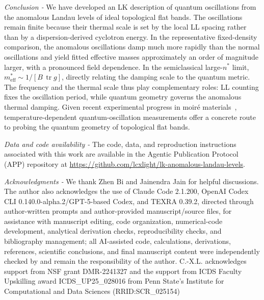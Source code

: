 \documentclass[prl,twocolumn,superscriptaddress,float,aps]{revtex4-2}
\newcommand{\tr}{\operatorname{tr}}
\newcommand{\meff}{m^{*}_{\mathrm{eff}}}
\newcommand{\metric}{g}
\begin{document}

{\it Conclusion - } We have developed an LK description of quantum
oscillations from the anomalous Landau levels of ideal topological flat bands.
The oscillations remain finite because their thermal scale is set by the local
LL spacing rather than by a dispersion-derived cyclotron energy. In the
representative fixed-density comparison, the anomalous oscillations damp much
more rapidly than the normal oscillations and yield fitted effective masses
approximately an order of magnitude larger, with a pronounced field
dependence. In the semiclassical large-$n^*$ limit,
$\meff\sim1/[B\,\tr\metric]$, directly relating the damping scale to the
quantum metric. The frequency and the thermal scale thus play complementary
roles: LL counting fixes the oscillation period, while quantum geometry governs
the anomalous thermal damping. Given recent experimental progress in moir\'e
materials~\cite{cao2018unconventional,serlin2020intrinsic,cai2023signatures,zeng2023thermodynamic,xu2023observation,liu2022quantum},
temperature-dependent quantum-oscillation measurements offer a concrete route
to probing the quantum geometry of topological flat bands.

{\it Data and code availability - }
The code, data, and reproduction instructions associated with this work are
available in the Agentic Publication Protocol (APP) repository at
\url{https://github.com/lcxlight/lk-anomalous-landau-levels}.

{\it Acknowledgments - }
We thank Zhen Bi and Jainendra Jain for helpful discussions. The author also acknowledges the use of Claude Code 2.1.200, OpenAI Codex CLI 0.140.0-alpha.2/GPT-5-based Codex, and TEXRA 0.39.2, directed through author-written prompts and author-provided manuscript/source files, for assistance with manuscript editing, code organization, numerical-code development, analytical derivation checks, reproducibility checks, and bibliography management; all AI-assisted code, calculations, derivations, references, scientific conclusions, and final manuscript content were independently checked by and remain the responsibility of the author. C.-X.L. acknowledges support from NSF grant DMR-2241327 and the support from ICDS Faculty Upskilling award ICDS\_UP25\_028016 from Penn State’s Institute for Computational and Data Sciences (RRID:SCR\_025154)


\end{document}
